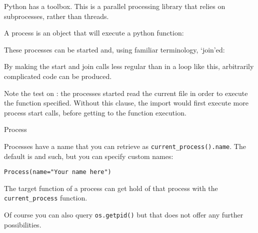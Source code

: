
\lstset{language=Python}

Python has a  toolbox.
This is a parallel processing library that relies on subprocesses,
rather than threads.

A process is an object that will execute a python function:

These processes can be started and,
using familiar terminology,
`join'ed:

By making the start and join calls less regular than
in a loop like this,
arbitrarily complicated code can be produced.

Note the test on :
the processes started read the current file in order to execute
the function specified.
Without this clause, the import would first execute more process start calls,
before getting to the function execution.

 {Process}

Processes have a name that you can retrieve as
\lstinline+current_process().name+.
The default is  and such,
but you can specify custom names:
\begin{lstlisting}
Process(name="Your name here")
\end{lstlisting}
The target function of a process can get hold of that process
with the  \lstinline+current_process+ function.

Of course you can also query \lstinline+os.getpid()+
but that does not offer any further possibilities.


